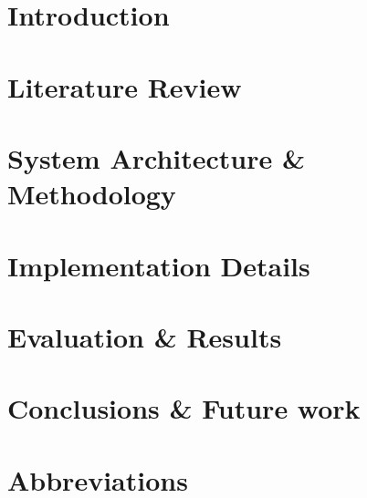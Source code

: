 \documentclass[a4paper,11pt,twoside,openany]{styles/ioniothesis}
\makeatletter
\def\cleardoublepage{\clearpage\if@twoside\ifodd\c@page\else
  \hbox{}\thispagestyle{empty}\newpage\if@twocolumn\hbox{}\newpage\fi\fi\fi}
\makeatother
\begin{document}
\newpage
{}

\cleardoublepage

\chapter{Introduction}\label{chapter:intro}


\chapter{Literature Review} \label{chapter:related_work}


\chapter{System Architecture \& Methodology} \label{methodology}


\chapter{Implementation Details} \label{chapter:discussion}


\chapter{Evaluation \& Results} \label{chapter:evaluation_results}
 

\chapter{Conclusions \& Future work} \label{chapter:conclusions}


\backmatter



\chapter*{Abbreviations}
\pagestyle{headings}

\end{document}
